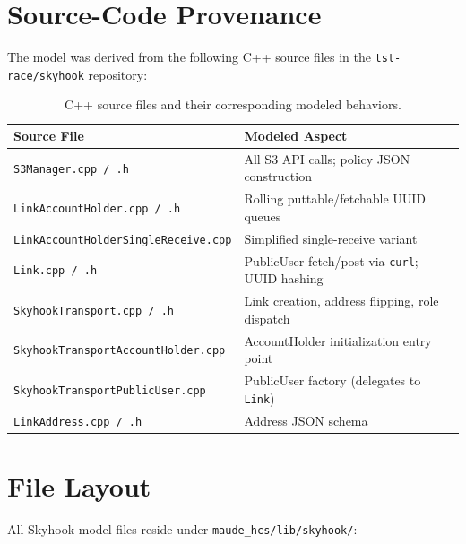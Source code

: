 \documentclass[11pt]{article}
\begin{document}
\section{Source-Code Provenance}\label{sec:provenance}

The model was derived from the following C++ source files in the
\texttt{tst-race/skyhook} repository:

\begin{table}[H]
\centering
\begin{tabular}{@{}ll@{}}
\toprule
\textbf{Source File} & \textbf{Modeled Aspect} \\
\midrule
\texttt{S3Manager.cpp / .h}
  & All S3 API calls; policy JSON construction \\
\texttt{LinkAccountHolder.cpp / .h}
  & Rolling puttable/fetchable UUID queues \\
\texttt{LinkAccountHolderSingleReceive.cpp}
  & Simplified single-receive variant \\
\texttt{Link.cpp / .h}
  & PublicUser fetch/post via \texttt{curl}; UUID hashing \\
\texttt{SkyhookTransport.cpp / .h}
  & Link creation, address flipping, role dispatch \\
\texttt{SkyhookTransportAccountHolder.cpp}
  & AccountHolder initialization entry point \\
\texttt{SkyhookTransportPublicUser.cpp}
  & PublicUser factory (delegates to \texttt{Link}) \\
\texttt{LinkAddress.cpp / .h}
  & Address JSON schema \\
\bottomrule
\end{tabular}
\caption{C++ source files and their corresponding modeled behaviors.}
\label{tab:provenance}
\end{table}

\section{File Layout}\label{sec:layout}

All Skyhook model files reside under
\texttt{maude\_hcs/lib/skyhook/}:
\end{document}

